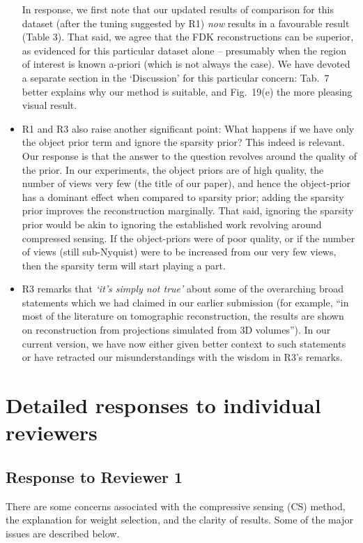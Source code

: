 \documentclass{article}
\begin{document}
\begin{itemize}
In response, we first note that our updated results of comparison for this dataset (after the tuning suggested by R1) \textit{now} results in a favourable result (Table 3).  That said, we agree that the FDK reconstructions can be superior, as evidenced for this particular dataset alone -- presumably when the region of interest is known a-priori (which is not always the case). We have devoted a separate section in the `Discussion' for this particular concern: Tab.~7 better explains why our method is suitable, and Fig.~19(e) the more pleasing visual result.  
\item R1 and R3 also raise another significant point:  What happens if we have only the object prior term and ignore the sparsity prior? This indeed is relevant. Our response is that the answer to the question revolves around the quality of the prior. In our experiments, the object priors are of high quality, the number of views very few (the title of our paper), and hence the object-prior has a dominant effect when compared to sparsity prior;  adding the sparsity prior improves the reconstruction marginally.  That said, ignoring the sparsity prior would be akin to ignoring the established work revolving around compressed sensing.  If the object-priors were of poor quality, or if the number of views (still sub-Nyquist) were to be increased from our very few views, then the sparsity term will start playing a part.  
\item R3 remarks that \textit{`it's simply not true'} about some of the overarching broad statements which we had claimed in our earlier submission (for example, ``in most of the literature on tomographic reconstruction, the results are shown on reconstruction from projections simulated from 3D volumes''). In our current version, we have now either given better context to such statements or have retracted our misunderstandings with the wisdom in R3's remarks.
\end{itemize}

\section{ Detailed responses to individual reviewers}

\subsection{Response to Reviewer 1}
There are some concerns associated with the compressive sensing (CS) method, the explanation for weight selection, and the clarity of results. Some of the major issues are described below. \\
\end{document}
